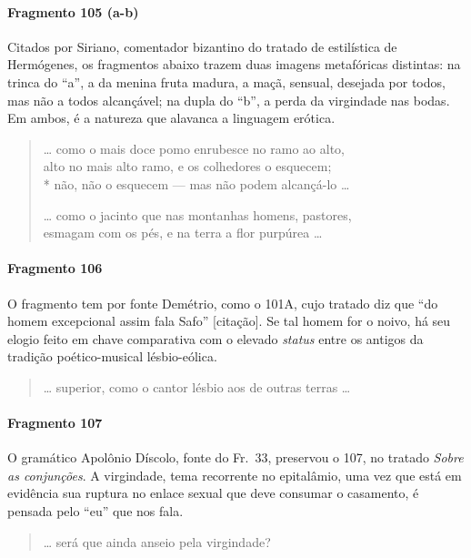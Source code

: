 {\paragraph{Fragmento 105 (a-b)}

{\small Citados por Siriano, comentador bizantino do tratado de estilística de
Hermógenes, os fragmentos abaixo trazem duas imagens metafóricas distintas: na
trinca do “a”, a da menina fruta madura, a maçã, sensual, desejada por todos,
mas não a todos alcançável; na dupla do “b”, a perda da virgindade nas bodas.
Em ambos, é a natureza que alavanca a linguagem erótica.}

\begin{verse}
\ldots{} como o mais doce pomo enrubesce no ramo ao \qb{}alto,\\
alto no mais alto ramo, e os colhedores o esquecem;\\*
não, não o esquecem --- mas não podem \qb{}alcançá-lo \ldots{}

\ldots{} como o jacinto que nas montanhas homens, \qb{}pastores,\\
esmagam com os pés, e na terra a flor purpúrea \ldots{}
\end{verse}

\paragraph{Fragmento 106}

{\small O fragmento tem por fonte Demétrio, como o 101A, cujo tratado diz que
``do homem excepcional assim fala Safo” [citação]. Se tal homem for o
noivo, há seu elogio feito em chave comparativa com o elevado \textit{status}
entre os antigos da tradição poético-musical lésbio-eólica.}

\begin{verse}
\ldots{} superior, como o cantor lésbio aos de outras \qb{}terras \ldots{}
\end{verse}

\paragraph{Fragmento 107}

{\small O gramático Apolônio Díscolo, fonte do Fr.~33, preservou o 107, no tratado
\textit{Sobre as conjunções}. A virgindade, tema recorrente no epitalâmio, uma
vez que está em evidência sua ruptura no enlace sexual que deve consumar o
casamento, é pensada pelo “eu” que nos fala.}

\begin{verse}
\ldots{} será que ainda anseio pela virgindade?
\end{verse}

}
